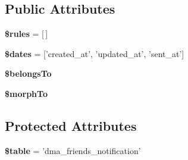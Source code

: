 \subsection*{Public Attributes}
\begin{DoxyCompactItemize}
\item 
\hypertarget{classDMA_1_1Friends_1_1Models_1_1Notification_a766ad083edbdd33b589c50997154eed2}{{\bfseries \$rules} = \mbox{[}$\,$\mbox{]}}\label{classDMA_1_1Friends_1_1Models_1_1Notification_a766ad083edbdd33b589c50997154eed2}

\item 
\hypertarget{classDMA_1_1Friends_1_1Models_1_1Notification_a5fb26a98fb9520c1444568e1c7e3515d}{{\bfseries \$dates} = \mbox{[}'created\+\_\+at', 'updated\+\_\+at', 'sent\+\_\+at'\mbox{]}}\label{classDMA_1_1Friends_1_1Models_1_1Notification_a5fb26a98fb9520c1444568e1c7e3515d}

\item 
{\bfseries \$belongs\+To}
\item 
{\bfseries \$morph\+To}
\end{DoxyCompactItemize}
\subsection*{Protected Attributes}
\begin{DoxyCompactItemize}
\item 
\hypertarget{classDMA_1_1Friends_1_1Models_1_1Notification_a4ff4d970351d372ad03efddcce990756}{{\bfseries \$table} = 'dma\+\_\+friends\+\_\+notification'}\label{classDMA_1_1Friends_1_1Models_1_1Notification_a4ff4d970351d372ad03efddcce990756}

\end{DoxyCompactItemize}


